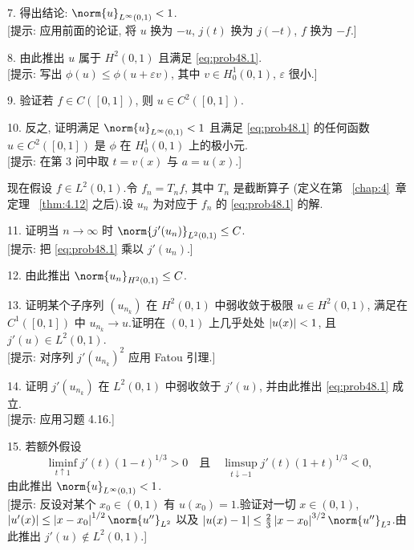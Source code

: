 \begin{problem}
7. 得出结论: $\norm{u}_{L^\infty(0,1)}<1$.\\
{[提示: 应用前面的论证, 将 $u$ 换为 $-u$, $j(t)$ 换为 $j(-t)$, $f$ 换为 $-f$.]}

8. 由此推出 $u$ 属于 $H^2(0,1)$ 且满足 \eqref{eq:prob48.1}.\\
{[提示: 写出 $\phi(u)\le\phi(u+\varepsilon v)$, 其中 $v\in H_0^1(0,1)$, $\varepsilon$ 很小.]}

9. 验证若 $f\in C([0,1])$, 则 $u\in C^2([0,1])$.

10. 反之, 证明满足 $\norm{u}_{L^\infty(0,1)}<1$ 且满足 \eqref{eq:prob48.1} 的任何函数
$u\in C^2([0,1])$ 是 $\phi$ 在 $H_0^1(0,1)$ 上的极小元.\\
{[提示: 在第 3 问中取 $t=v(x)$ 与 $a=u(x)$.]}

现在假设 $f\in L^2(0,1)$.令 $f_n=T_nf$, 其中 $T_n$ 是截断算子 (定义在第~
\ref{chap:4}~章定理~
\ref{thm:4.12}
之后).设 $u_n$ 为对应于 $f_n$ 的 \eqref{eq:prob48.1} 的解.

11. 证明当 $n\to\infty$ 时 $\norm{j'(u_n)}_{L^2(0,1)}\le C$.\\
{[提示: 把 \eqref{eq:prob48.1} 乘以 $j'(u_n)$.]}

12. 由此推出 $\norm{u_n}_{H^2(0,1)}\le C$.

13. 证明某个子序列 $(u_{n_k})$ 在 $H^2(0,1)$ 中弱收敛于极限 $u\in H^2(0,1)$, 满足在
$C^1([0,1])$ 中 $u_{n_k}\to u$.证明在 $(0,1)$ 上几乎处处 $\left|u(x)\right|<1$, 且
$j'(u)\in L^2(0,1)$.\\
{[提示: 对序列 $j'(u_{n_k})^2$ 应用 Fatou 引理.]}

14. 证明 $j'(u_{n_k})$ 在 $L^2(0,1)$ 中弱收敛于 $j'(u)$, 并由此推出 \eqref{eq:prob48.1} 成立.\\
{[提示: 应用习题 4.16.]}

15. 若额外假设
\begin{equation*}
\liminf_{t\uparrow1}j'(t)(1-t)^{1/3}>0\quad\text{且}\quad\limsup_{t\downarrow-1}j'(t)(1+t)^{1/3}<0,
\end{equation*}
由此推出 $\norm{u}_{L^\infty(0,1)}<1$.\\
{[提示: 反设对某个 $x_0\in(0,1)$ 有 $u(x_0)=1$.验证对一切 $x\in(0,1)$,
$\abs{u'(x)}\le\abs{x-x_0}^{1/2}\norm{u''}_{L^2}$ 以及
$\abs{u(x)-1}\le\frac23\abs{x-x_0}^{3/2}\norm{u''}_{L^2}$.由此推出 $j'(u)\notin L^2(0,1)$.]}
\end{problem}


